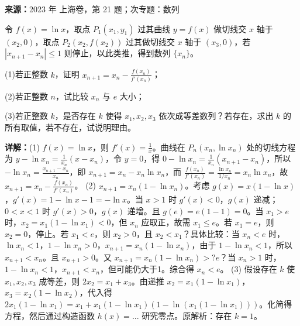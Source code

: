 \begin{question}[points=18]
\textbf{来源：}2023 年 上海卷，第 21 题；次专题：数列\par
令 $f(x)=\ln x$，取点 $P_1(x_1,y_1)$ 过其曲线 $y=f(x)$ 做切线交 $x$ 轴于 $(x_2,0)$，取点 $P_2(x_2,f(x_2))$ 过其做切线交 $x$ 轴于 $(x_3,0)$，若 $|x_{n+1}-x_n|\le 1$ 则停止，以此类推，得到数列 $\{x_n\}$。

(1)若正整数 $k$，证明 $x_{n+1}=x_n-\frac{f(x_n)}{f'(x_n)}$；

(2)若正整数 $n$，试比较 $x_n$ 与 $e$ 大小；

(3)若正整数 $k$，是否存在 $k$ 使得 $x_1,x_2,x_3$ 依次成等差数列？若存在，求出 $k$ 的所有取值，若不存在，试说明理由。
\begin{solution}

\textbf{详解：}(1) $f(x)=\ln x$，则 $f'(x)=\frac{1}{x}$。曲线在 $P_n(x_n,\ln x_n)$ 处的切线方程为 $y-\ln x_n=\frac{1}{x_n}(x-x_n)$，令 $y=0$，得 $0-\ln x_n=\frac{1}{x_n}(x_{n+1}-x_n)$，所以 $-\ln x_n = \frac{x_{n+1}-x_n}{x_n}$，即 $x_{n+1}=x_n-x_n\ln x_n$，而 $\frac{f(x_n)}{f'(x_n)}=\frac{\ln x_n}{1/x_n}=x_n\ln x_n$，故 $x_{n+1}=x_n-\frac{f(x_n)}{f'(x_n)}$。
(2) $x_{n+1}=x_n(1-\ln x_n)$。考虑 $g(x)=x(1-\ln x)$，$g'(x)=1-\ln x-1=-\ln x$。当 $x>1$ 时 $g'(x)<0$，$g(x)$ 递减；$0<x<1$ 时 $g'(x)>0$，$g(x)$ 递增。且 $g(e)=e(1-1)=0$。当 $x_1>e$ 时，$x_2=x_1(1-\ln x_1)<0$，但 $x_n$ 应取正，故需 $x_1\le e$。若 $x_1=e$，则 $x_2=0$，停止。若 $x_1<e$，则 $x_2>0$，且 $x_2<x_1$？具体比较：当 $x_n<e$ 时，$\ln x_n<1$，$1-\ln x_n>0$，$x_{n+1}=x_n(1-\ln x_n)$，由于 $1-\ln x_n<1$，所以 $x_{n+1}<x_n$。且 $x_{n+1}>0$。又 $x_{n+1}=x_n(1-\ln x_n) >? e$？当 $x_n>1$ 时，$1-\ln x_n<1$，$x_{n+1}<x_n$，但可能仍大于1。综合得 $x_n<e$。
(3) 假设存在 $k$ 使 $x_1,x_2,x_3$ 成等差，则 $2x_2=x_1+x_3$。由递推 $x_2=x_1(1-\ln x_1)$，$x_3=x_2(1-\ln x_2)$，代入得 $2x_1(1-\ln x_1)=x_1+x_1(1-\ln x_1)(1-\ln(x_1(1-\ln x_1)))$。化简得方程，然后通过构造函数 $h(x)=...$ 研究零点。原解析：存在 $k=1$。
\end{solution}
\end{question}

